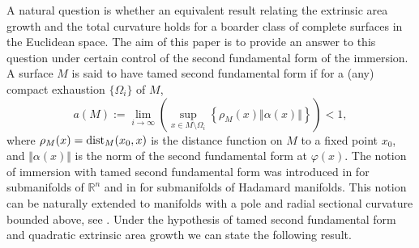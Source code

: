 \documentclass[a4paper]{amsart}
\theoremstyle{definition}
\numberwithin{equation}{section}
\begin{document}
A natural question  is whether  an equivalent result relating the extrinsic area growth and the total curvature holds for a boarder class of complete surfaces in the Euclidean space. The aim of this paper is to provide an answer to this question under certain control of the second fundamental form of the immersion. 
 A surface $M$ is said to have tamed second fundamental form if for a (any) compact exhaustion $\{\Omega_i\}$ of $M$,
\begin{equation}\label{eq1.3}
a(M):=\lim_{i\to\infty}\left(\sup_{x\in M\setminus \Omega_i}\left\{\rho_M(x)\Vert\alpha(x)\Vert\right\}\right)<1,
\end{equation}
where $\rho_{M} (x) = {\rm dist}_{M}(x_0, x)$ is the  distance function on $M$ to a fixed point $x_0$, and $\Vert \alpha(x)\Vert $ is the  norm of the second fundamental form at $\varphi(x)$.  The notion of immersion with tamed second fundamental form was introduced in \cite{Pac} for submanifolds of $\mathbb{R}^{n}$ and in \cite{Pac2} for submanifolds of Hadamard manifolds. This notion can  be naturally extended to manifolds with a pole and radial sectional curvature bounded above, see \cite{GPGap}. Under the hypothesis of tamed second fundamental form and quadratic extrinsic area growth we can state the following result.
\end{document}
